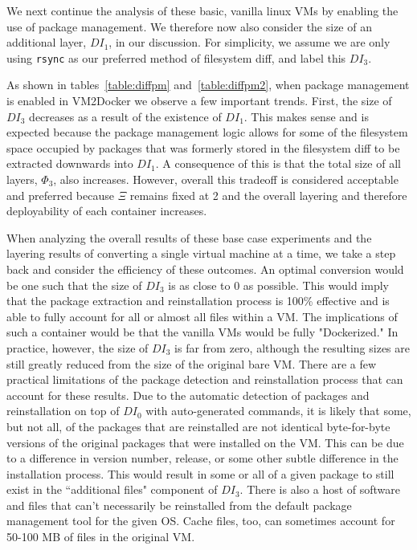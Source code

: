 We next continue the analysis of these basic, vanilla linux VMs by enabling the use of package management. We therefore now also consider the size of an additional layer, $DI_1$, in our discussion. For simplicity, we assume we are only using \texttt{rsync} as our preferred method of filesystem diff, and label this $DI_3$.

As shown in tables~\ref{table:diffpm} and~\ref{table:diffpm2}, when package management is enabled in VM2Docker we observe a few important trends. First, the size of $DI_3$ decreases as a result of the existence of $DI_1$. This makes sense and is expected because the package management logic allows for some of the filesystem space occupied by packages that was formerly stored in the filesystem diff to be extracted downwards into $DI_1$. A consequence of this is that the total size of all layers, $\Phi_3$, also increases. However, overall this tradeoff is considered acceptable and preferred because $\Xi$ remains fixed at 2 and the overall layering and therefore deployability of each container increases.

When analyzing the overall results of these base case experiments and the layering results of converting a single virtual machine at a time, we take a step back and consider the efficiency of these outcomes. An optimal conversion would be one such that the size of $DI_3$ is as close to 0 as possible. This would imply that the package extraction and reinstallation process is 100\% effective and is able to fully account for all or almost all files within a VM. The implications of such a container would be that the vanilla VMs would be fully "Dockerized." In practice, however, the size of $DI_3$ is far from zero, although the resulting sizes are still greatly reduced from the size of the original bare VM. There are a few practical limitations of the package detection and reinstallation process that can account for these results. Due to the automatic detection of packages and reinstallation on top of $DI_0$ with auto-generated commands, it is likely that some, but not all, of the packages that are reinstalled are not identical byte-for-byte versions of the original packages that were installed on the VM. This can be due to a difference in version number, release, or some other subtle difference in the installation process. This would result in some or all of a given package to still exist in the ``additional files" component of $DI_3$. There is also a host of software and files that can't necessarily be reinstalled from the default package management tool for the given OS. Cache files, too, can sometimes account for 50-100 MB of files in the original VM.

